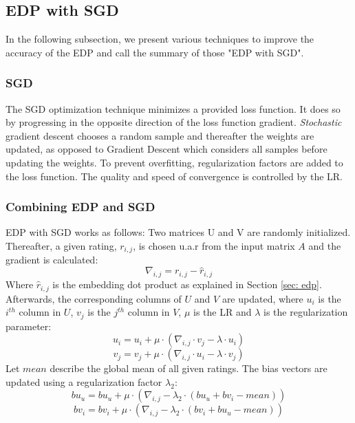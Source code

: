 \subsection{\ac{EDP} with \ac{SGD}}\label{sec:sgd}

In the following subsection, we present various techniques to improve the accuracy of the \ac{EDP} and call the summary of those "EDP with SGD".

\subsubsection{\ac{SGD}}

The \ac{SGD} optimization technique minimizes a provided loss function. It does so by progressing in the opposite direction of the loss function gradient. \textit{Stochastic} gradient descent chooses a random sample and thereafter the weights are updated, as opposed to Gradient Descent which considers all samples before updating the weights. To prevent overfitting, regularization factors are added to the loss function. The quality and speed of convergence is controlled by the \ac{LR}.

\subsubsection{Combining \ac{EDP} and \ac{SGD}}

\ac{EDP} with \ac{SGD} works as follows: Two matrices U and V are randomly initialized. Thereafter, a given rating, $r_{i,j}$, is chosen u.a.r from the input matrix $A$ and the gradient is calculated:
\begin{equation}
    \nabla_{i,j} = r_{i,j} - \hat{r}_{i,j}
\end{equation}
Where $\hat{r}_{i,j}$ is the embedding dot product as explained in Section \ref{sec: edp}. Afterwards, the corresponding columns of $U$ and $V$ are updated, where $u_i$ is the $i^{th}$ column in $U$, $v_j$ is the $j^{th}$ column in $V$, $\mu$ is the \ac{LR} and $\lambda$ is the regularization parameter:
\begin{equation}
    u_i = u_i + \mu \cdot (\nabla_{i,j} \cdot v_j - \lambda \cdot u_i)
\end{equation}
\begin{equation}
    v_j = v_j + \mu \cdot (\nabla_{i,j} \cdot u_i - \lambda \cdot v_j)
\end{equation}
Let $mean$ describe the global mean of all given ratings. The bias vectors are updated using a regularization factor $\lambda_2$:
\begin{equation}
    bu_u = bu_u + \mu \cdot (\nabla_{i,j} - \lambda_2 \cdot (bu_u + bv_i - mean))
\end{equation}
\begin{equation}
    bv_i = bv_i + \mu \cdot (\nabla_{i,j} - \lambda_2 \cdot (bv_i + bu_u - mean))
\end{equation}


